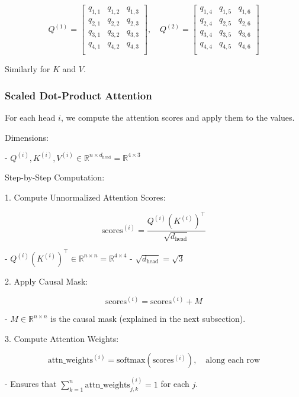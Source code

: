 \documentclass{article}
\begin{document}
\[
    Q^{(1)} = \begin{bmatrix}
        q_{1,1} & q_{1,2} & q_{1,3} \\
        q_{2,1} & q_{2,2} & q_{2,3} \\
        q_{3,1} & q_{3,2} & q_{3,3} \\
        q_{4,1} & q_{4,2} & q_{4,3} \\
    \end{bmatrix},
    \quad
    Q^{(2)} = \begin{bmatrix}
        q_{1,4} & q_{1,5} & q_{1,6} \\
        q_{2,4} & q_{2,5} & q_{2,6} \\
        q_{3,4} & q_{3,5} & q_{3,6} \\
        q_{4,4} & q_{4,5} & q_{4,6} \\
    \end{bmatrix}
\]

Similarly for \( K \) and \( V \).

\subsubsection{Scaled Dot-Product Attention}

For each head \( i \), we compute the attention scores and apply them to the values.

Dimensions:

- \( Q^{(i)}, K^{(i)}, V^{(i)} \in \mathbb{R}^{n \times d_{\text{head}}} = \mathbb{R}^{4 \times 3} \)

Step-by-Step Computation:

1. Compute Unnormalized Attention Scores:

   \[
   \text{scores}^{(i)} = \frac{Q^{(i)} (K^{(i)})^\top}{\sqrt{d_{\text{head}}}}
   \]

   - \( Q^{(i)} (K^{(i)})^\top \in \mathbb{R}^{n \times n} = \mathbb{R}^{4 \times 4} \)
   - \( \sqrt{d_{\text{head}}} = \sqrt{3} \)

2. Apply Causal Mask:

   \[
   \text{scores}^{(i)} = \text{scores}^{(i)} + M
   \]

   - \( M \in \mathbb{R}^{n \times n} \) is the causal mask (explained in the next subsection).

3. Compute Attention Weights:

   \[
   \text{attn\_weights}^{(i)} = \text{softmax}(\text{scores}^{(i)}), \quad \text{along each row}
   \]

   - Ensures that \( \sum_{k=1}^{n} \text{attn\_weights}^{(i)}_{j,k} = 1 \) for each \( j \).
\end{document}
